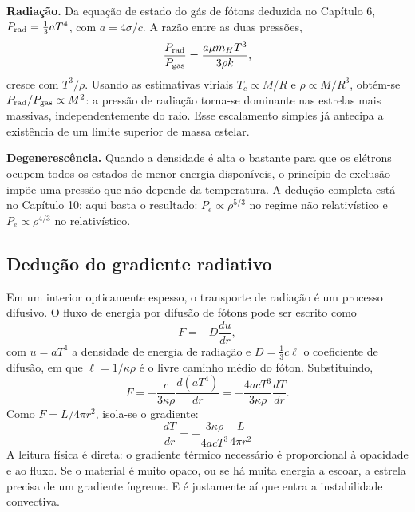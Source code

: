 \documentclass[11pt,a4paper]{article}
\begin{document}
\textbf{Radiação.} Da equação de estado do gás de fótons deduzida no Capítulo 6, $P_{\rm rad}=\frac{1}{3}aT^{4}$, com $a=4\sigma/c$. A razão entre as duas pressões,
\[
\frac{P_{\rm rad}}{P_{\rm gas}}=\frac{a\mu m_HT^{3}}{3\rho k},
\]
cresce com $T^{3}/\rho$. Usando as estimativas viriais $T_c\propto M/R$ e $\rho\propto M/R^{3}$, obtém-se $P_{\rm rad}/P_{\rm gas}\propto M^{2}$: a pressão de radiação torna-se dominante nas estrelas mais massivas, independentemente do raio. Esse escalamento simples já antecipa a existência de um limite superior de massa estelar.

\textbf{Degenerescência.} Quando a densidade é alta o bastante para que os elétrons ocupem todos os estados de menor energia disponíveis, o princípio de exclusão impõe uma pressão que não depende da temperatura. A dedução completa está no Capítulo 10; aqui basta o resultado: $P_e\propto\rho^{5/3}$ no regime não relativístico e $P_e\propto\rho^{4/3}$ no relativístico.

\subsection*{Dedução do gradiente radiativo}

Em um interior opticamente espesso, o transporte de radiação é um processo difusivo. O fluxo de energia por difusão de fótons pode ser escrito como
\[
F=-D\frac{du}{dr},
\]
com $u=aT^{4}$ a densidade de energia de radiação e $D=\frac{1}{3}c\ell$ o coeficiente de difusão, em que $\ell=1/\kappa\rho$ é o livre caminho médio do fóton. Substituindo,
\[
F=-\frac{c}{3\kappa\rho}\frac{d(aT^{4})}{dr}=-\frac{4acT^{3}}{3\kappa\rho}\frac{dT}{dr}.
\]
Como $F=L/4\pi r^{2}$, isola-se o gradiente:
\[
\boxed{\ \frac{dT}{dr}=-\frac{3\kappa\rho}{4acT^{3}}\frac{L}{4\pi r^{2}}\ }
\]
A leitura física é direta: o gradiente térmico necessário é proporcional à opacidade e ao fluxo. Se o material é muito opaco, ou se há muita energia a escoar, a estrela precisa de um gradiente íngreme. E é justamente aí que entra a instabilidade convectiva.
\end{document}
